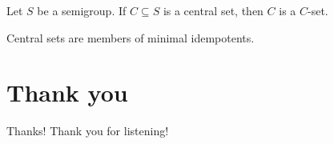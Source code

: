 \documentclass{beamer}
\begin{document}
\begin{frame}
  \begin{theorem}
    Let $S$ be a semigroup.
    If $C \subseteq S$ is a central set, then $C$ is a $C$-set. 
  \end{theorem}

  \pause

  \begin{definition}
    Central sets are members of minimal idempotents.
  \end{definition}
\end{frame}

\section{Thank you}
\begin{frame}
  \begin{block}{Thanks!}
    Thank you for listening! \\
  \end{block}
\end{frame}
\end{document}
